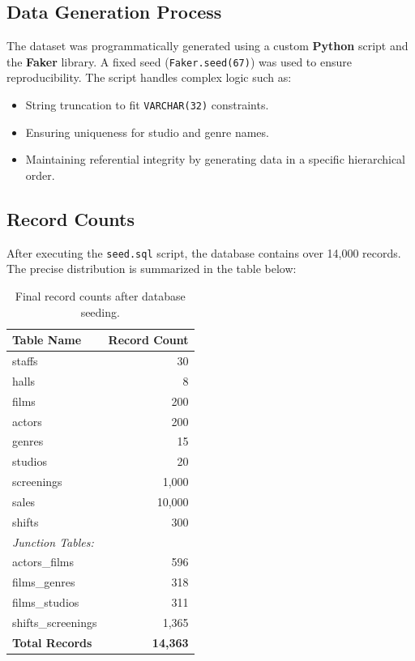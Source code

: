 \documentclass[11pt, a4paper]{article}
\begin{document}
\subsection{Data Generation Process}
The dataset was programmatically generated using a custom \textbf{Python} script and the \textbf{Faker} library. A fixed seed (\texttt{Faker.seed(67)}) was used to ensure reproducibility. The script handles complex logic such as:
\begin{itemize}
    \item String truncation to fit \texttt{VARCHAR(32)} constraints.
    \item Ensuring uniqueness for studio and genre names.
    \item Maintaining referential integrity by generating data in a specific hierarchical order.
\end{itemize}

\subsection{Record Counts}
After executing the \texttt{seed.sql} script, the database contains over 14,000 records. The precise distribution is summarized in the table below:

\begin{table}[h!]
\centering
\begin{tabular}{lr}
\toprule
\textbf{Table Name} & \textbf{Record Count} \\
\midrule
staffs & 30 \\
halls & 8 \\
films & 200 \\
actors & 200 \\
genres & 15 \\
studios & 20 \\
screenings & 1,000 \\
sales & 10,000 \\
shifts & 300 \\
\midrule
\textit{Junction Tables:} & \\
actors\_films & 596 \\
films\_genres & 318 \\
films\_studios & 311 \\
shifts\_screenings & 1,365 \\
\midrule
\textbf{Total Records} & \textbf{14,363} \\
\bottomrule
\end{tabular}
\caption{Final record counts after database seeding.}
\end{table}
\end{document}
